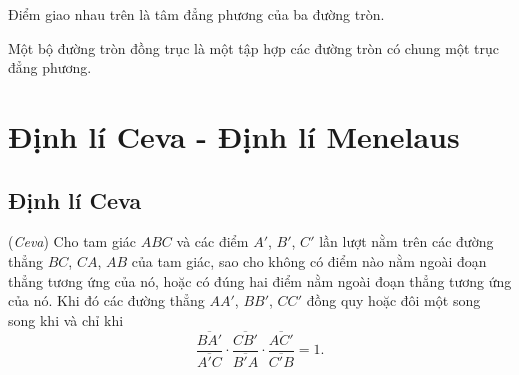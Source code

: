 \documentclass{article} %
\begin{document}
        \begin{definition}
            Điểm giao nhau trên là tâm đẳng phương của ba đường tròn.
        \end{definition}
    
        \begin{definition}
            Một bộ đường tròn đồng trục là một tập hợp các đường tròn có chung một trục đẳng phương.
        \end{definition}

\section{Định lí Ceva - Định lí Menelaus}

    \subsection{Định lí Ceva}

        \begin{theorem}
            (\textit{Ceva}) Cho tam giác \(ABC\) và các điểm \(A'\), \(B'\), \(C'\) lần lượt nằm trên các đường thẳng \(BC\), \(CA\), \(AB\) của tam giác, sao cho không có điểm nào nằm ngoài đoạn thẳng tương ứng của nó, hoặc có đúng hai điểm nằm ngoài đoạn thẳng tương ứng của nó. Khi đó các đường thẳng \(AA'\), \(BB'\), \(CC'\) đồng quy hoặc đôi một song song khi và chỉ khi
            \[\frac{\overline{BA'}}{\overline{A'C}} \cdot \frac{\overline{CB'}}{\overline{B'A}} \cdot \frac{\overline{AC'}}{\overline{C'B}} = 1.\]
        \end{theorem}
\end{document}
